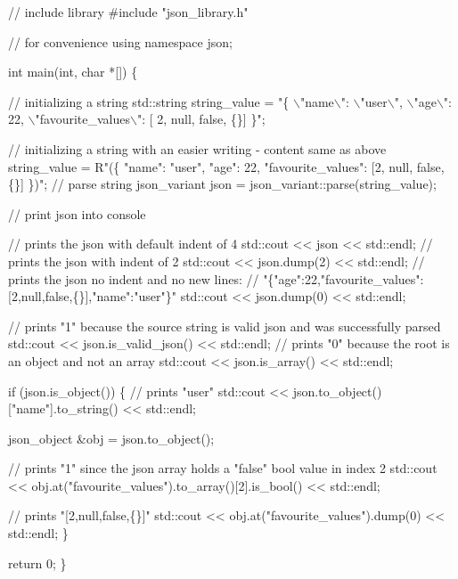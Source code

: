 \begin{DoxyCode}
\textcolor{comment}{// include library}
\textcolor{preprocessor}{#include "json\_library.h"}

\textcolor{comment}{// for convenience}
\textcolor{keyword}{using namespace }json;

\textcolor{keywordtype}{int} main(\textcolor{keywordtype}{int}, \textcolor{keywordtype}{char} *[]) \{

    \textcolor{comment}{// initializing a string}
    std::string string\_value = \textcolor{stringliteral}{"\{ }
\textcolor{stringliteral}{        \(\backslash\)"name\(\backslash\)": \(\backslash\)"user\(\backslash\)", }
\textcolor{stringliteral}{        \(\backslash\)"age\(\backslash\)": 22, }
\textcolor{stringliteral}{        \(\backslash\)"favourite\_values\(\backslash\)": [ 2, null, false, \{\}] }
\textcolor{stringliteral}{    \}"};

    \textcolor{comment}{// initializing a string with an easier writing - content same as above}
    string\_value = R\textcolor{stringliteral}{"(\{}
\textcolor{stringliteral}{        "name": "user",}
\textcolor{stringliteral}{        "age": 22,}
\textcolor{stringliteral}{        "favourite\_values": [2, null, false, \{\}]}
\textcolor{stringliteral}{    \})";}
\textcolor{stringliteral}{}
\textcolor{stringliteral}{    }\textcolor{comment}{// parse string}
    json\_variant json = json\_variant::parse(string\_value);

    \textcolor{comment}{// print json into console}

    \textcolor{comment}{// prints the json with default indent of 4}
    std::cout << json << std::endl;
    \textcolor{comment}{// prints the json with indent of 2    }
    std::cout << json.dump(2) << std::endl;     
    \textcolor{comment}{// prints the json no indent and no new lines: }
    \textcolor{comment}{// "\{"age":22,"favourite\_values":[2,null,false,\{\}],"name":"user"\}"}
    std::cout << json.dump(0) << std::endl;     

    \textcolor{comment}{// prints "1" because the source string is valid json and was successfully parsed}
    std::cout << json.is\_valid\_json() << std::endl; 
    \textcolor{comment}{// prints "0" because the root is an object and not an array}
    std::cout << json.is\_array() << std::endl;     

    \textcolor{keywordflow}{if} (json.is\_object()) \{
        \textcolor{comment}{// prints "user"}
        std::cout << json.to\_object()[\textcolor{stringliteral}{"name"}].to\_string() << std::endl;                 

        json\_object &obj = json.to\_object();

        \textcolor{comment}{// prints "1" since the json array holds a "false" bool value in index 2}
        std::cout << obj.at(\textcolor{stringliteral}{"favourite\_values"}).to\_array()[2].is\_bool() << std::endl;   

        \textcolor{comment}{// prints "[2,null,false,\{\}]"}
        std::cout << obj.at(\textcolor{stringliteral}{"favourite\_values"}).dump(0) << std::endl;                  
    \}

    \textcolor{keywordflow}{return} 0;
\}
\end{DoxyCode}


